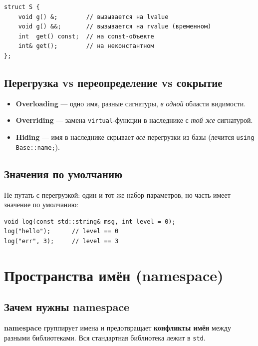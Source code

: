 \begin{lstlisting}
struct S {
    void g() &;        // вызывается на lvalue
    void g() &&;       // вызывается на rvalue (временном)
    int  get() const;  // на const-объекте
    int& get();        // на неконстантном
};
\end{lstlisting}

\subsection{Перегрузка vs переопределение vs сокрытие}

\begin{itemize}[leftmargin=2em]
    \item \textbf{Overloading} --- одно имя, разные сигнатуры, \textit{в одной}
          области видимости.
    \item \textbf{Overriding} --- замена \texttt{virtual}-функции в наследнике с
          \textit{той же} сигнатурой.
    \item \textbf{Hiding} --- имя в наследнике скрывает \textit{все} перегрузки
          из базы (лечится \texttt{using Base::name;}).
\end{itemize}

\subsection{Значения по умолчанию}

Не путать с перегрузкой: один и тот же набор параметров, но часть имеет значение
по умолчанию:

\begin{lstlisting}
void log(const std::string& msg, int level = 0);
log("hello");      // level == 0
log("err", 3);     // level == 3
\end{lstlisting}


\section{Пространства имён (namespace)}

\subsection{Зачем нужны namespace}

\textbf{namespace} группирует имена и предотвращает \textbf{конфликты имён} между
разными библиотеками. Вся стандартная библиотека лежит в \texttt{std}.

